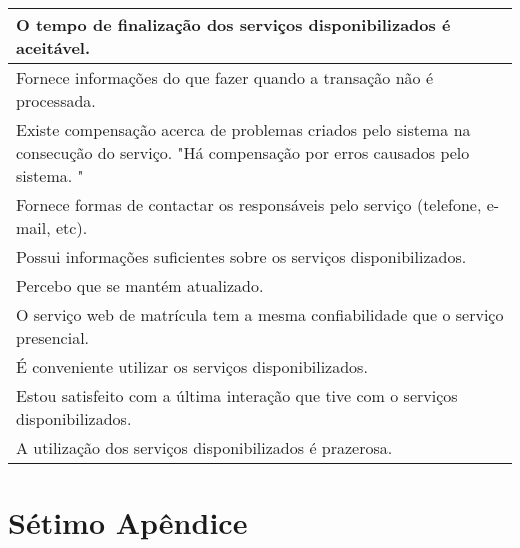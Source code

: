\begin{apendicesenv}
\begin{table}[]
{\begin{tabular}{|l|}
O tempo de finalização dos serviços disponibilizados é aceitável. \\ \hline
Fornece informações do que fazer quando a transação não é processada. \\ \hline
Existe compensação acerca de problemas criados pelo sistema na consecução do serviço. "Há compensação por erros causados pelo sistema. " \\ \hline
Fornece formas de contactar os responsáveis pelo serviço (telefone, e-mail, etc). \\ \hline
Possui informações suficientes sobre os serviços disponibilizados. \\ \hline
Percebo que se mantém atualizado. \\ \hline
O serviço web de matrícula tem a mesma confiabilidade que o serviço presencial. \\ \hline
É conveniente utilizar os serviços disponibilizados. \\ \hline
Estou satisfeito com a última interação que tive com o serviços disponibilizados. \\ \hline
A utilização dos serviços disponibilizados é prazerosa. \\ \hline
\end{tabular}%
}
\end{table}

\chapter{Sétimo Apêndice}

\label{questionariogoogle}


\end{apendicesenv}
